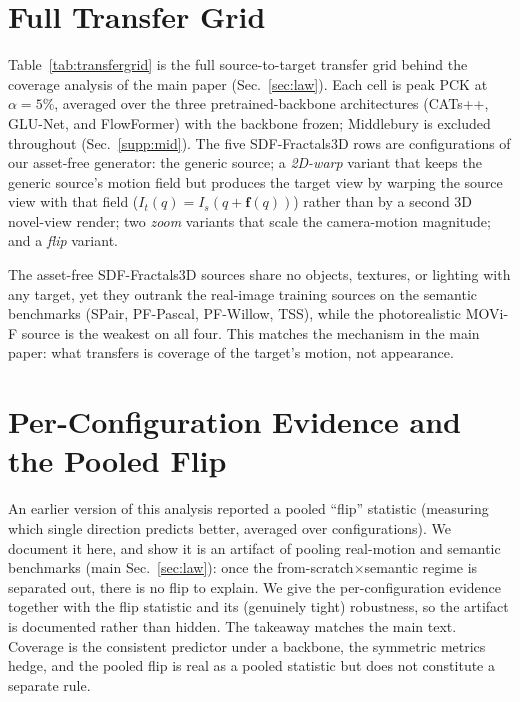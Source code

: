 \documentclass[runningheads]{llncs}
\newcommand{\pck}{PCK}
\begin{document}
\section{Full Transfer Grid}
\label{supp:transfergrid}

Table~\ref{tab:transfergrid} is the full source-to-target transfer grid behind the
coverage analysis of the main paper (Sec.~\ref{sec:law}). Each cell is peak \pck{} at
$\alpha{=}5\%$, averaged over the three pretrained-backbone architectures (CATs++,
GLU-Net, and FlowFormer) with the backbone frozen; Middlebury is excluded throughout
(Sec.~\ref{supp:mid}). The five SDF-Fractals3D rows are configurations of our
asset-free generator: the generic source; a \emph{2D-warp} variant that keeps the
generic source's motion field but produces the target view by warping the source view
with that field ($I_t(q)=I_s(q{+}\mathbf{f}(q))$) rather than by a second 3D
novel-view render; two \emph{zoom} variants that scale the camera-motion magnitude;
and a \emph{flip} variant.

The asset-free SDF-Fractals3D sources share no objects, textures, or lighting with any
target, yet they outrank the real-image training sources on the semantic benchmarks
(SPair, PF-Pascal, PF-Willow, TSS), while the photorealistic MOVi-F source is the
weakest on all four. This matches the mechanism in the main paper: what transfers is
coverage of the target's motion, not appearance.

\begin{table}[tbp]
\centering
\caption{\textbf{Full source-to-target transfer grid.} Peak \pck{} at $\alpha{=}5\%$,
mean over pretrained-frozen CATs++, GLU-Net, and FlowFormer; \textbf{bold} $=$ best
source per target. K12/K15 $=$ KITTI-2012/2015; SDF-F3D $=$ held-out SDF-Fractals3D
split.}
\label{tab:transfergrid}
\scriptsize
\setlength{\tabcolsep}{4pt}
\resizebox{\linewidth}{!}{}
\end{table}

\section{Per-Configuration Evidence and the Pooled Flip}
\label{supp:law}

An earlier version of this analysis reported a pooled ``flip'' statistic
(measuring which single direction predicts better, averaged over configurations). We document it
here, and show it is an artifact of pooling real-motion and semantic benchmarks
(main Sec.~\ref{sec:law}): once the from-scratch$\times$semantic regime is separated
out, there is no flip to explain. We give the per-configuration evidence
together with the flip statistic and its (genuinely tight) robustness, so the
artifact is documented rather than hidden. The takeaway matches the main text.
Coverage is the consistent predictor under a backbone, the symmetric metrics
hedge, and the pooled flip is real as a pooled statistic but does not constitute a
separate rule.
\end{document}
